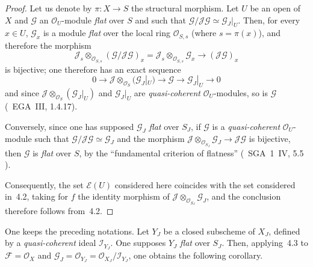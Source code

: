 \begin{proof}
Let us denote by \(\pi\colon X\to S\) the structural morphism. Let \(U\) be
an open of \(X\) and \(\mathcal{G}\) an \(\mathcal{O}_{U}\)-module
\emph{flat} over \(S\) and such that
\(\mathcal{G}/\mathcal{J}\mathcal{G}\simeq\mathcal{G}_{J}|_{U}\). Then, for
every \(x\in U\), \(\mathcal{G}_{x}\) is a module \emph{flat} over the local
ring \(\mathcal{O}_{S,s}\) (where \(s=\pi(x)\)), and therefore the morphism
\[
\mathcal{J}_{s}\otimes_{\mathcal{O}_{S,s}}(\mathcal{G}/\mathcal{J}\mathcal{G})_{x}
  =\mathcal{J}_{s}\otimes_{\mathcal{O}_{S,s}}\mathcal{G}_{x}
  \longrightarrow(\mathcal{J}\mathcal{G})_{x}
\]
is bijective; one therefore has an exact sequence
\[
0 \longrightarrow
  \mathcal{J}\otimes_{\mathcal{O}_{S}}(\mathcal{G}_{J}|_{U})
  \longrightarrow\mathcal{G}
  \longrightarrow\mathcal{G}_{J}|_{U}
  \longrightarrow 0
\]
and since \(\mathcal{J}\otimes_{\mathcal{O}_{S}}(\mathcal{G}_{J}|_{U})\) and
\(\mathcal{G}_{J}|_{U}\) are \emph{quasi-coherent} \(\mathcal{O}_{U}\)-modules,
so is \(\mathcal{G}\) (\cf\ EGA~III, 1.4.17).

Conversely, since one has supposed \(\mathcal{G}_{J}\) \emph{flat} over
\(S_{J}\), if \(\mathcal{G}\) is a \emph{quasi-coherent}
\(\mathcal{O}_{U}\)-module such that
\(\mathcal{G}/\mathcal{J}\mathcal{G}\simeq\mathcal{G}_{J}\) and the morphism
\(\mathcal{J}\otimes_{\mathcal{O}_{S_{J}}}\mathcal{G}_{J}
  \to\mathcal{J}\mathcal{G}\)
is bijective, then \(\mathcal{G}\) is \emph{flat} over \(S\), by the
``fundamental criterion of flatness'' (\cf\ SGA~1~IV,
5.5%
{\renewcommand{\thefootnote}{(78)}}).

Consequently, the set \(\mathcal{E}(U)\) considered here coincides with the
set considered in~4.2, taking for \(f\) the identity morphism of
\(\mathcal{J}\otimes_{\mathcal{O}_{S_{J}}}\mathcal{G}_{J}\), and the
conclusion therefore follows from~4.2.
\end{proof}

{\renewcommand{\thefootnote}{(79)}}%
One keeps the preceding notations. Let \(Y_{J}\) be a closed subscheme of
\(X_{J}\), defined by a \emph{quasi-coherent} ideal \(\mathcal{I}_{Y_{J}}\).
One supposes \(Y_{J}\) \emph{flat} over \(S_{J}\). Then, applying~4.3 to
\(\mathcal{F}=\mathcal{O}_{X}\) and
\(\mathcal{G}_{J}=\mathcal{O}_{Y_{J}}
  =\mathcal{O}_{X_{J}}/\mathcal{I}_{Y_{J}}\),
one obtains the following corollary.

